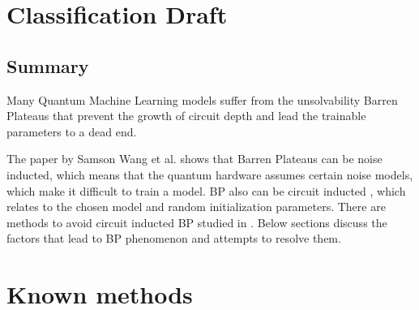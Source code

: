 \section{Classification Draft}

\subsection{Summary}

Many Quantum Machine Learning models  suffer from the unsolvability Barren Plateaus \cite{zhaoReviewQuantumNeural2021} that prevent the growth of circuit depth and lead the trainable parameters to a dead end.

The paper \cite{wangNoiseinducedBarrenPlateaus2021} by Samson Wang et al. shows that Barren Plateaus can be noise inducted, which means that the quantum hardware assumes certain noise models, which make it difficult to train a model. 
BP also can be circuit inducted \cite{mccleanBarrenPlateausQuantum2018}, which relates to the chosen model and random initialization parameters.
There are methods to avoid circuit inducted BP studied in \cite{pesahAbsenceBarrenPlateaus2021, cerezoCostFunctionDependent2021,skolikLayerwiseLearningQuantum2021}.
Below sections discuss the factors that lead to BP phenomenon and attempts to resolve them.



\section{Known methods}





